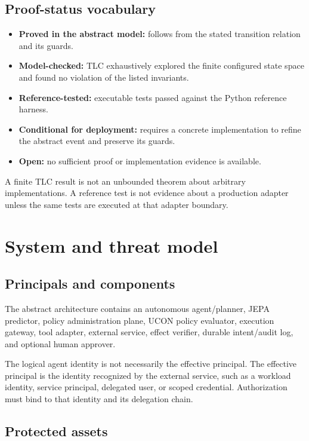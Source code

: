 \documentclass[11pt,a4paper]{article}
\theoremstyle{remark}
\begin{document}
\subsection{Proof-status vocabulary}

\begin{itemize}[leftmargin=2em]
\item \textbf{Proved in the abstract model:} follows from the stated transition relation and its guards.
\item \textbf{Model-checked:} TLC exhaustively explored the finite configured state space and found no violation of the listed invariants.
\item \textbf{Reference-tested:} executable tests passed against the Python reference harness.
\item \textbf{Conditional for deployment:} requires a concrete implementation to refine the abstract event and preserve its guards.
\item \textbf{Open:} no sufficient proof or implementation evidence is available.
\end{itemize}

A finite TLC result is not an unbounded theorem about arbitrary implementations. A reference test is not evidence about a production adapter unless the same tests are executed at that adapter boundary.

\section{System and threat model}

\subsection{Principals and components}

The abstract architecture contains an autonomous agent/planner, JEPA predictor, policy administration plane, UCON policy evaluator, execution gateway, tool adapter, external service, effect verifier, durable intent/audit log, and optional human approver.

The logical agent identity is not necessarily the effective principal. The effective principal is the identity recognized by the external service, such as a workload identity, service principal, delegated user, or scoped credential. Authorization must bind to that identity and its delegation chain.

\subsection{Protected assets}
\end{document}
